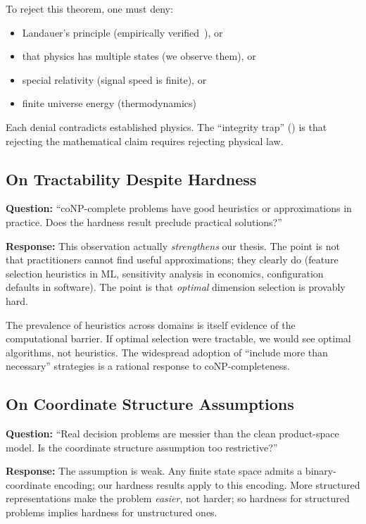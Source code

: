 To reject this theorem, one must deny:
\begin{itemize}
\item Landauer's principle (empirically verified~\cite{berut2012experimental}), or
\item that physics has multiple states (we observe them), or
\item special relativity (signal speed is finite), or
\item finite universe energy (thermodynamics)
\end{itemize}

Each denial contradicts established physics. The ``integrity trap'' () is that rejecting the mathematical claim requires rejecting physical law.

\subsection{On Tractability Despite Hardness}

\textbf{Question:} ``coNP-complete problems have good heuristics or approximations in practice. Does the hardness result preclude practical solutions?''

\textbf{Response:} This observation actually \emph{strengthens} our thesis. The point is not that practitioners cannot find useful approximations; they clearly do (feature selection heuristics in ML, sensitivity analysis in economics, configuration defaults in software). The point is that \emph{optimal} dimension selection is provably hard.

The prevalence of heuristics across domains is itself evidence of the computational barrier. If optimal selection were tractable, we would see optimal algorithms, not heuristics. The widespread adoption of ``include more than necessary'' strategies is a rational response to coNP-completeness.

\subsection{On Coordinate Structure Assumptions}

\textbf{Question:} ``Real decision problems are messier than the clean product-space model. Is the coordinate structure assumption too restrictive?''

\textbf{Response:} The assumption is weak. Any finite state space admits a binary-coordinate encoding; our hardness results apply to this encoding. More structured representations make the problem \emph{easier}, not harder; so hardness for structured problems implies hardness for unstructured ones.

